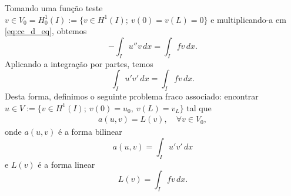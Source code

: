 Tomando uma função teste $v\in V_0=H^1_0(I):=\{v\in H^1(I);~v(0)=v(L)=0\}$ e multiplicando-a em \eqref{eq:cc_d_eq}, obtemos
\begin{equation}
  - \int_I u''v\,dx = \int_I fv\,dx.
\end{equation}
Aplicando a integração por partes, temos
\begin{equation}
  \int_I u'v'\,dx = \int_I fv\,dx.
\end{equation}
Desta forma, definimos o seguinte problema fraco associado: encontrar $u\in V := \{v\in H^1(I);~v(0)=u_0,~v(L)=v_L\}$ tal que
\begin{align}
  a(u,v) = L(v),\quad\forall v\in V_0,
\end{align}
onde $a(u,v)$ é a forma bilinear
\begin{equation}
  a(u,v) = \int_I u'v'\,dx
\end{equation}
e $L(v)$ é a forma linear
\begin{equation}
  L(v) = \int_I fv\,dx.
\end{equation}

